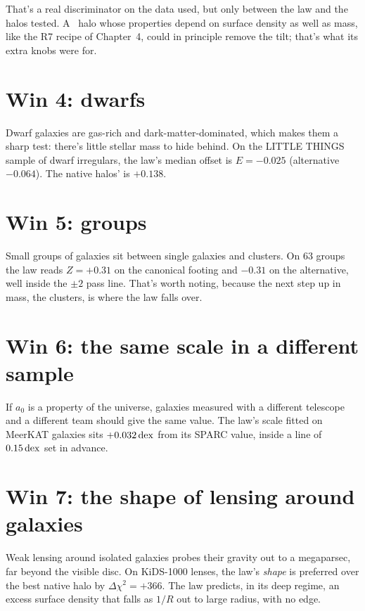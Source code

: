 \begin{honestbox}
That's a real discriminator on the data used, but only between the law and the halos tested. A \LCDM\ halo whose properties depend on surface density as well as mass, like the R7 recipe of Chapter~4, could in principle remove the tilt; that's what its extra knobs were for.
\end{honestbox}

\section{Win 4: dwarfs}

Dwarf galaxies are gas-rich and dark-matter-dominated, which makes them a sharp test: there's little stellar mass to hide behind. On the LITTLE THINGS sample of dwarf irregulars, the law's median offset is $E=-0.025$ (alternative $-0.064$). The native halos' is $+0.138$.

\section{Win 5: groups}

Small groups of galaxies sit between single galaxies and clusters. On 63 groups the law reads $Z=+0.31$ on the canonical footing and $-0.31$ on the alternative, well inside the $\pm2$ pass line. That's worth noting, because the next step up in mass, the clusters, is where the law falls over.

\section{Win 6: the same scale in a different sample}

If $a_0$ is a property of the universe, galaxies measured with a different telescope and a different team should give the same value. The law's scale fitted on MeerKAT galaxies sits $+0.032\,\mathrm{dex}$ from its SPARC value, inside a line of $0.15\,\mathrm{dex}$ set in advance.

\section{Win 7: the shape of lensing around galaxies}

Weak lensing around isolated galaxies probes their gravity out to a megaparsec, far beyond the visible disc. On KiDS-1000 lenses, the law's \emph{shape} is preferred over the best native halo by $\Delta\chi^2=+366$. The law predicts, in its deep regime, an excess surface density that falls as $1/R$ out to large radius, with no edge.

